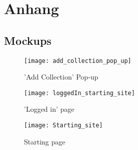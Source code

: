 \section{Anhang}\label{sec:anhang}

\subsection{Mockups}\label{subsec:Mockups}

\begin{figure}[htbp]
    \centering
    \texttt{[image: add\_collection\_pop\_up]}
    \caption{'Add Collection' Pop-up}\label{fig:figure}
\end{figure}

\begin{figure}[htbp]
    \centering
    \texttt{[image: loggedIn\_starting\_site]}
    \caption{'Logged in' page}\label{fig:figure2}
\end{figure}

\begin{figure}[htbp]
    \centering
    \texttt{[image: Starting\_site]}
    \caption{Starting page}\label{fig:figure3}
\end{figure}
